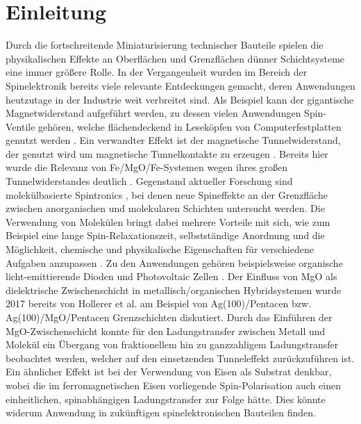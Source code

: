 \chapter{Einleitung}

Durch die fortschreitende Miniaturisierung technischer Bauteile spielen die 
physikalischen Effekte an Oberflächen und Grenzflächen dünner Schichtsysteme 
eine immer größere Rolle.\newline
In der Vergangenheit wurden im Bereich der Spinelektronik bereits viele relevante Entdeckungen gemacht, deren 
Anwendungen heutzutage in der Industrie weit verbreitet sind.
Als Beispiel kann der gigantische Magnetwiderstand 
aufgeführt werden, zu dessen vielen Anwendungen Spin-Ventile gehören,
welche flächendeckend in Leseköpfen von Computerfestplatten genutzt werden \cite{PhysRevLett.61.2472,PhysRevB.39.4828,daughton2000gmr,jogschies2015recent}. 
Ein verwandter Effekt ist der magnetische Tunnelwiderstand, 
der genutzt wird um magnetische Tunnelkontakte
zu erzeugen \cite{JULLIERE1975225}. Bereits hier wurde die Relevanz von Fe/MgO/Fe-Systemen
wegen ihres großen Tunnelwiderstandes deutlich \cite{parkin2004giant}.\newline
Gegenstand aktueller Forschung sind molekülbasierte Spintronics \cite{cinchetti2017activating},
bei denen neue Spineffekte an der Grenzfläche zwischen anorganischen und molekularen Schichten untersucht werden.
Die Verwendung von Molekülen bringt dabei mehrere Vorteile mit sich, wie zum Beispiel eine 
lange Spin-Relaxationszeit, selbstständige Anordnung und die Möglichkeit, chemische und physikalische Eigenschaften für 
verschiedene Aufgaben anzupassen \cite{cinchetti2009determination,sun2018progress}. 
Zu den Anwendungen gehören beispielsweise organische licht-emittierende Dioden und Photovoltaic Zellen \cite{koch2007organic}.\newline
Der Einfluss von MgO als dielektrische Zwischenschicht in metallisch/organischen Hybridsystemen wurde  2017 bereits von
Hollerer et al. am Beispiel von Ag(100)/Pentacen bzw. Ag(100)/MgO/Pentacen Grenzschichten diskutiert. Durch das Einführen der 
MgO-Zwischenschicht konnte für den Ladungstransfer zwischen Metall und Molekül ein Übergang von fraktionellem hin zu 
ganzzahligem Ladungstransfer beobachtet werden, welcher auf den einsetzenden Tunneleffekt zurückzuführen ist.
Ein ähnlicher Effekt ist bei der Verwendung von Eisen als Substrat denkbar, 
wobei die im ferromagnetischen Eisen vorliegende Spin-Polarisation auch einen einheitlichen,
spinabhängigen Ladungstransfer zur Folge hätte. Dies könnte widerum Anwendung in zukünftigen spinelektronischen Bauteilen  finden.\newline
